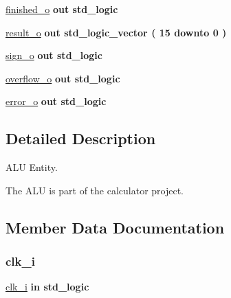 \begin{DoxyCompactItemize}
\item 
\hyperlink{classalu_a3e4609af33f8de496eb53352525eb9e7}{finished\+\_\+o}  {\bfseries {\bfseries \textcolor{keywordflow}{out}\textcolor{vhdlchar}{ }}} {\bfseries \textcolor{comment}{std\+\_\+logic}\textcolor{vhdlchar}{ }} 
\item 
\hyperlink{classalu_a4c4aa4e657b005516ee13f5b57054b9a}{result\+\_\+o}  {\bfseries {\bfseries \textcolor{keywordflow}{out}\textcolor{vhdlchar}{ }}} {\bfseries \textcolor{comment}{std\+\_\+logic\+\_\+vector}\textcolor{vhdlchar}{ }\textcolor{vhdlchar}{(}\textcolor{vhdlchar}{ }\textcolor{vhdlchar}{ } \textcolor{vhdldigit}{15} \textcolor{vhdlchar}{ }\textcolor{keywordflow}{downto}\textcolor{vhdlchar}{ }\textcolor{vhdlchar}{ } \textcolor{vhdldigit}{0} \textcolor{vhdlchar}{ }\textcolor{vhdlchar}{)}\textcolor{vhdlchar}{ }} 
\item 
\hyperlink{classalu_ad931fb1d7982869689b7072b46bf5f0b}{sign\+\_\+o}  {\bfseries {\bfseries \textcolor{keywordflow}{out}\textcolor{vhdlchar}{ }}} {\bfseries \textcolor{comment}{std\+\_\+logic}\textcolor{vhdlchar}{ }} 
\item 
\hyperlink{classalu_a7771d7a30216542931475a12593b972c}{overflow\+\_\+o}  {\bfseries {\bfseries \textcolor{keywordflow}{out}\textcolor{vhdlchar}{ }}} {\bfseries \textcolor{comment}{std\+\_\+logic}\textcolor{vhdlchar}{ }} 
\item 
\hyperlink{classalu_a43d3fe459020288f9fd3fe64782b7402}{error\+\_\+o}  {\bfseries {\bfseries \textcolor{keywordflow}{out}\textcolor{vhdlchar}{ }}} {\bfseries \textcolor{comment}{std\+\_\+logic}\textcolor{vhdlchar}{ }} 
\end{DoxyCompactItemize}


\subsection{Detailed Description}
A\+LU Entity. 

The A\+LU is part of the calculator project. 

\subsection{Member Data Documentation}
\mbox{\label{classalu_abe949478e3f8aad0a6aeb1842fa6c608}} 
\subsubsection{\texorpdfstring{clk\+\_\+i}{clk\_i}}
{\footnotesize\ttfamily \hyperlink{classalu_abe949478e3f8aad0a6aeb1842fa6c608}{clk\+\_\+i} {\bfseries \textcolor{keywordflow}{in}\textcolor{vhdlchar}{ }} {\bfseries \textcolor{comment}{std\+\_\+logic}\textcolor{vhdlchar}{ }} \hspace{0.3cm}{\ttfamily [Port]}}

